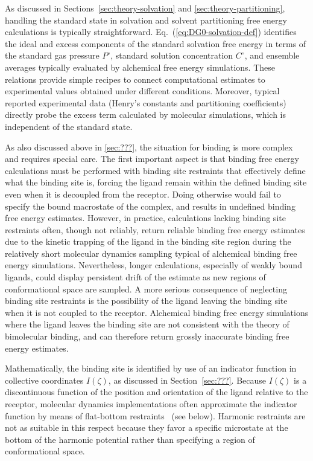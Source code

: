 \documentclass[9pt,bestpractices]{livecoms}
\begin{document}
As discussed in Sections~\ref{sec:theory-solvation} and \ref{sec:theory-partitioning}, handling the standard state in solvation and solvent partitioning free energy calculations is typically straightforward. Eq.~(\ref{eq:DG0-solvation-def}) identifies the ideal and excess components of the standard solvation free energy in terms of the standard gas pressure $P^\circ$, standard solution concentration $C^\circ$, and ensemble averages typically evaluated by alchemical free energy simulations. These relations provide simple recipes to connect computational estimates to experimental values obtained under different conditions. Moreover, typical reported experimental data (Henry's constants and partitioning coefficients) directly probe the excess term calculated by molecular simulations, which is independent of the standard state.

As also discussed above in \ref{sec:???}, the situation for binding is more complex and requires special care. The first important aspect is that binding free energy calculations must be performed with binding site restraints that effectively define what the binding site is, forcing the ligand remain within the defined binding site even when it is decoupled from the receptor. Doing otherwise would fail to specify the bound macrostate of the complex, and results in undefined binding free energy estimates. However, in practice, calculations lacking binding site restraints often, though not reliably, return reliable binding free energy estimates due to the kinetic trapping of the ligand in the binding site region during the relatively short molecular dynamics sampling typical of alchemical binding free energy simulations. Nevertheless, longer calculations, especially of weakly bound ligands, could display persistent drift of the estimate as new regions of conformational space are sampled. A more serious consequence of neglecting binding site restraints is the possibility of the ligand leaving the binding site when it is not coupled to the receptor. Alchemical binding free energy simulations where the ligand leaves the binding site are not consistent with the theory of bimolecular binding, and can therefore return grossly inaccurate binding free energy estimates.

Mathematically, the binding site is identified by use of an indicator function in collective coordinates $I(\zeta)$, as discussed in Section~\ref{sec:???}. Because $I(\zeta)$ is a discontinuous function of the position and orientation of the ligand relative to the receptor, molecular dynamics implementations often approximate the indicator function by means of flat-bottom restraints~\cite{chen2007can, wu2021alchemical} (see below). Harmonic restraints are not as suitable in this respect because they favor a specific microstate at the bottom of the harmonic potential rather than specifying a region of conformational space.
\end{document}
